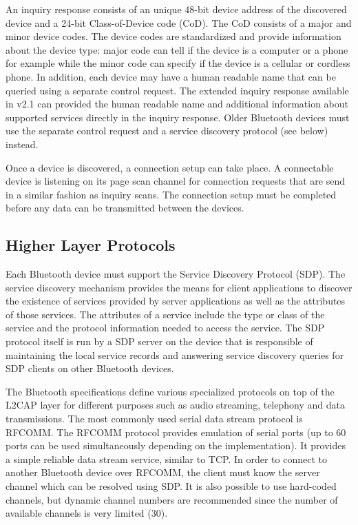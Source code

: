 An inquiry response consists of an unique 48-bit device address of the discovered device and a 24-bit Class-of-Device code (CoD). The CoD consists of a major and 
minor device codes. The device codes are standardized and provide information about the device type: major code can tell if the device is a computer or a phone for 
example while the minor code can specify if the device is a cellular or cordless phone. In addition, each device may have a human readable name that can be queried using
a separate control request. The extended inquiry response available in v2.1 can provided the human readable name and additional information about supported services
directly in the inquiry response. Older Bluetooth devices must use the separate control request and a service discovery protocol (see below) instead.

Once a device is discovered, a connection setup can take place. A connectable device is listening on its page scan channel for connection requests that are send in a
similar fashion as inquiry scans. The connection setup must be completed before any data can be transmitted between the devices.

\subsection{Higher Layer Protocols}

Each Bluetooth device must support the Service Discovery Protocol (SDP). The service discovery mechanism provides the means for client applications to discover
the existence of services provided by server applications as well as the attributes of those services. The attributes of a service include the type or class of the service and
the protocol information needed to access the service. The SDP protocol itself is run by a SDP server on the device that is responsible of maintaining the local service records
and answering service discovery queries for SDP clients on other Bluetooth devices.

The Bluetooth specifications define various specialized protocols on top of the L2CAP layer for different purposes such as audio streaming, telephony and data
transmissions. The most commonly used serial data stream protocol is RFCOMM. The RFCOMM protocol provides emulation of serial ports (up to 60 ports can be used
simultaneously depending on the implementation). It provides a simple reliable data stream service, similar to TCP. In order to connect to another Bluetooth device over
RFCOMM, the client must know the server channel which can be resolved using SDP. It is also possible to use hard-coded channels, but dynamic channel numbers are 
recommended since the number of available channels is very limited (30).

